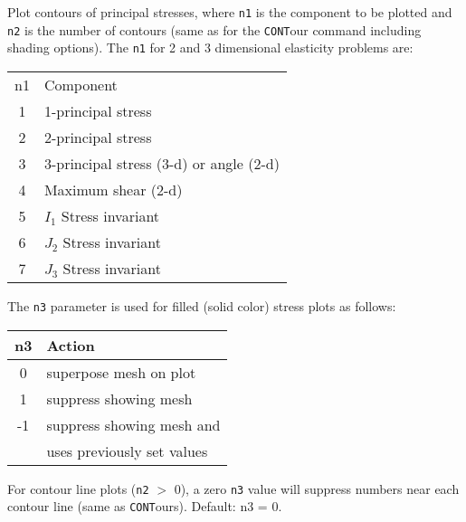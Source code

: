 \headb

Plot contours of principal stresses, where {\tt n1} is the component
to be plotted and {\tt n2} is the number of contours (same as
for the {\tt CONT}our command including shading options).
The {\tt n1} for 2 and 3 dimensional elasticity problems are:

\begin{center}
\begin{tabular}{c | l }
 n1 & Component \\
  1 & 1-principal stress \\
  2 & 2-principal stress \\
  3 & 3-principal stress (3-d) or angle (2-d) \\
  4 & Maximum shear (2-d) \\
  5 & $I_1$ Stress invariant \\
  6 & $J_2$ Stress invariant \\
  7 & $J_3$ Stress invariant \\
\end{tabular}
\end{center}

The {\tt n3} parameter is used for filled (solid color) stress
plots as follows:

\begin{center}
\begin{tabular}{c | l }
 n3 & Action \\ \hline
  0 & superpose mesh on plot \\
  1 & suppress showing mesh \\
 -1 & suppress showing mesh and\\
    & uses previously set values
\end{tabular}
\end{center}

For contour line plots ({\tt n2} $>$ 0), a zero {\tt n3} value will
suppress numbers near each contour line (same as
{\tt CONT}ours). Default: n3 = 0.
\vfill
\eject
